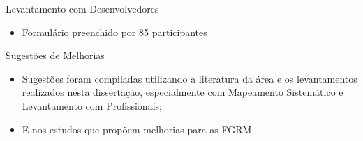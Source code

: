 \documentclass[t,14pt,mathserif]{beamer}
\begin{document}
\begin{frame}{Levantamento com Desenvolvedores}

    \begin{itemize}
        \item Formulário preenchido por 85 participantes
    \end{itemize}

    \begin{table}[htpb]
    \centering
    \caption{Função desempenhada pelos participantes}
\label{tab:grafico_melhorias_fgrm_funcao_particantes}
    \end{table}

\end{frame}

\begin{frame}{Sugestões de Melhorias}

    \begin{itemize}
        \item Sugestões foram compiladas utilizando a literatura da área e os
            levantamentos realizados nesta dissertação, especialmente com
            Mapeamento Sistemático e Levantamento com Profissionais;
        \item E nos estudos que propõem melhorias para as
            FGRM~\cite{zimmermann2009improving, bettenburg2008makes,
                singh2011bug}.
    \end{itemize}

\end{frame}
\end{document}
